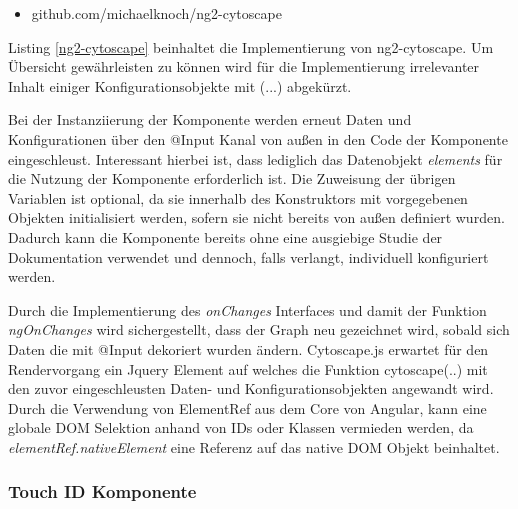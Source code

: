\begin{itemize}
  \item{github.com/michaelknoch/ng2-cytoscape}
\end{itemize}



\noindent Listing \ref{ng2-cytoscape} beinhaltet die Implementierung von ng2-cytoscape.
Um Übersicht gewährleisten zu können wird für die Implementierung irrelevanter Inhalt einiger Konfigurationsobjekte mit (...) abgekürzt.

Bei der Instanziierung der Komponente werden erneut Daten und Konfigurationen über den @Input Kanal von außen
in den Code der Komponente eingeschleust. Interessant hierbei ist,
dass lediglich das Datenobjekt \emph{elements} für die Nutzung der Komponente erforderlich ist.
Die Zuweisung der übrigen Variablen ist optional, da sie innerhalb des Konstruktors mit vorgegebenen Objekten initialisiert werden, sofern sie nicht bereits von außen definiert wurden.
Dadurch kann die Komponente bereits ohne eine ausgiebige Studie der Dokumentation verwendet und dennoch, falls verlangt, individuell konfiguriert werden.

Durch die Implementierung des \emph{onChanges} Interfaces und damit der Funktion \emph{ngOnChanges} wird sichergestellt,
dass der Graph neu gezeichnet wird, sobald sich Daten die mit @Input dekoriert wurden ändern.
Cytoscape.js erwartet für den Rendervorgang ein Jquery Element auf welches die Funktion cytoscape({..})
mit den zuvor eingeschleusten Daten- und Konfigurationsobjekten angewandt wird.
Durch die Verwendung von ElementRef aus dem Core von Angular, kann eine globale \ac{DOM} Selektion anhand von IDs oder Klassen vermieden werden, da \emph{elementRef.nativeElement} eine Referenz auf das native \ac{DOM} Objekt beinhaltet.

\subsubsection{Touch ID Komponente}

